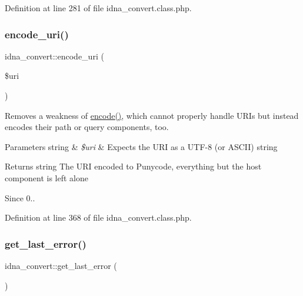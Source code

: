 Definition at line 281 of file idna\+\_\+convert.\+class.\+php.

\mbox{\label{classidna__convert_a21b3f0bb158b689c9d835bb1c7a30114}} 
\subsubsection{\texorpdfstring{encode\+\_\+uri()}{encode\_uri()}}
{\footnotesize\ttfamily idna\+\_\+convert\+::encode\+\_\+uri (\begin{DoxyParamCaption}\item[{}]{\$uri }\end{DoxyParamCaption})}

Removes a weakness of \hyperlink{classidna__convert_ae6e83c86d02d1ad9b8a7eb48435863bd}{encode()}, which cannot properly handle U\+R\+Is but instead encodes their path or query components, too. 
\begin{DoxyParams}[1]{Parameters}
string & {\em \$uri} & Expects the U\+RI as a U\+T\+F-\/8 (or A\+S\+C\+II) string \\
\hline
\end{DoxyParams}
\begin{DoxyReturn}{Returns}
string The U\+RI encoded to Punycode, everything but the host component is left alone 
\end{DoxyReturn}
\begin{DoxySince}{Since}
0.. 
\end{DoxySince}


Definition at line 368 of file idna\+\_\+convert.\+class.\+php.

\mbox{\label{classidna__convert_adcf7a0902a83a834ce05fc34a460fccd}} 
\subsubsection{\texorpdfstring{get\+\_\+last\+\_\+error()}{get\_last\_error()}}
{\footnotesize\ttfamily idna\+\_\+convert\+::get\+\_\+last\+\_\+error (\begin{DoxyParamCaption}{ }\end{DoxyParamCaption})}

